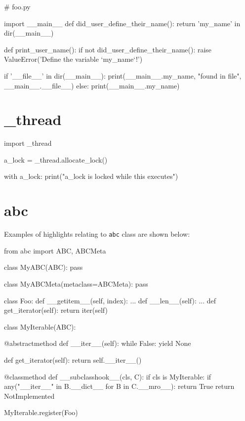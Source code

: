 \documentclass[oneside]{syntexpydoc}
\begin{document}
\begin{python}
# foo.py

import __main__
def did_user_define_their_name():
    return 'my_name' in dir(__main__)

def print_user_name():
    if not did_user_define_their_name():
        raise ValueError('Define the variable `my_name`!')

    if '__file__' in dir(__main__):
        print(__main__.my_name, "found in file", __main__.__file__)
    else:
        print(__main__.my_name)
\end{python}

\section{\_thread}
\begin{python}
import _thread

a_lock = _thread.allocate_lock()

with a_lock:
    print("a_lock is locked while this executes")
\end{python}

\section{abc}

Examples of highlights relating to {\tt abc} class are shown below:
\begin{python}
from abc import ABC, ABCMeta

class MyABC(ABC):
    pass

class MyABCMeta(metaclass=ABCMeta):
    pass
\end{python}

\begin{python}
class Foo:
    def __getitem__(self, index):
        ...
    def __len__(self):
        ...
    def get_iterator(self):
        return iter(self)

class MyIterable(ABC):

    @abstractmethod
    def __iter__(self):
        while False:
            yield None

    def get_iterator(self):
        return self.__iter__()

    @classmethod
    def __subclasshook__(cls, C):
        if cls is MyIterable:
            if any("__iter__" in B.__dict__ for B in C.__mro__):
                return True
        return NotImplemented

MyIterable.register(Foo)
\end{python}
\end{document}
